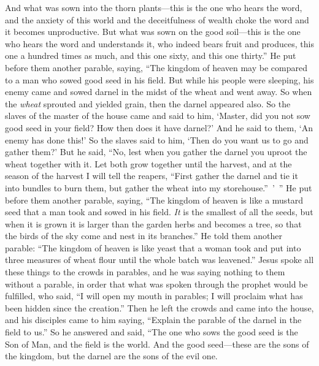 \begin{biblechapter}
\verse And what was sown into the thorn plants—this is the one who hears the word, and the anxiety of this world and the deceitfulness of wealth choke the word and it becomes unproductive.
\verse But what was sown on the good soil—this is the one who hears the word and understands it, who indeed bears fruit and produces, this one a hundred times as much, and this one sixty, and this one thirty.”
 He put before them another parable, saying, “The kingdom of heaven may be compared to a man who sowed good seed in his field.
\verse But while his people were sleeping, his enemy came and sowed darnel in the midst of the wheat and went away.
\verse So when the \textit{wheat} sprouted and yielded grain, then the darnel appeared also.
\verse So the slaves of the master of the house came and said to him, ‘Master, did you not sow good seed in your field? How then does it have darnel?’
\verse And he said to them, ‘An enemy has done this!’ So the slaves said to him, ‘Then do you want us to go and gather them?’
\verse But he said, “No, lest when you gather the darnel you uproot the wheat together with it.
\verse Let both grow together until the harvest, and at the season of the harvest I will tell the reapers, “First gather the darnel and tie it into bundles to burn them, but gather the wheat into my storehouse.” ’ ”
 He put before them another parable, saying, “The kingdom of heaven is like a mustard seed that a man took and sowed in his field.
\verse \textit{It} is the smallest of all the seeds, but when it is grown it is larger than the garden herbs and becomes a tree, so that the birds of the sky come and nest in its branches.”
 He told them another parable: “The kingdom of heaven is like yeast that a woman took and put into three measures of wheat flour until the whole batch was leavened.”
 Jesus spoke all these things to the crowds in parables, and he was saying nothing to them without a parable,
\verse in order that what was spoken through the prophet would be fulfilled, who said, “I will open my mouth in parables; 
I will proclaim what has been hidden since the creation.”
 Then he left the crowds and came into the house, and his disciples came to him saying, “Explain the parable of the darnel in the field to us.”
\verse So he answered and said, “The one who sows the good seed is the Son of Man,
\verse and the field is the world. And the good seed—these are the sons of the kingdom, but the darnel are the sons of the evil one.

\end{biblechapter}
